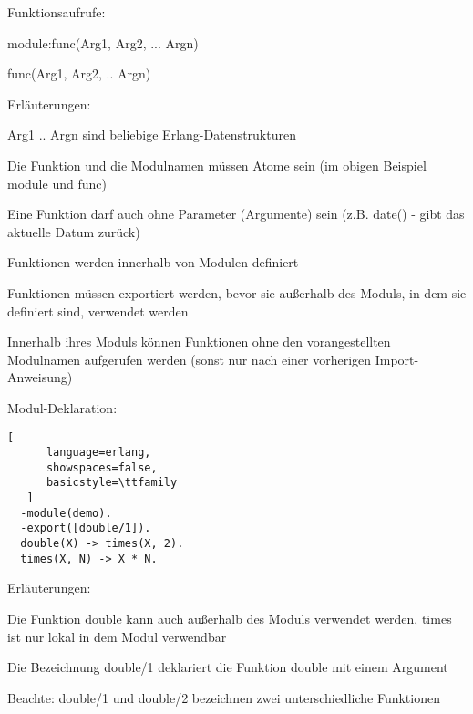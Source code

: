 \documentclass[10pt]{article}
\begin{document}
\begin{itemize*}
Funktionsaufrufe:
\begin{itemize*}
  \item module:func(Arg1, Arg2, ... Argn)
  \item func(Arg1, Arg2, .. Argn)
  \item Erläuterungen:
  \begin{itemize*}
    \item Arg1 .. Argn sind beliebige Erlang-Datenstrukturen
    \item Die Funktion und die Modulnamen müssen Atome sein (im obigen Beispiel module und func)
    \item Eine Funktion darf auch ohne Parameter (Argumente) sein (z.B. date() - gibt das aktuelle Datum zurück)
    \item Funktionen werden innerhalb von Modulen definiert
    \item Funktionen müssen exportiert werden, bevor sie außerhalb des Moduls, in dem sie definiert sind, verwendet werden
    \item Innerhalb ihres Moduls können Funktionen ohne den vorangestellten Modulnamen aufgerufen werden (sonst nur nach einer vorherigen Import-Anweisung)
  \end{itemize*}
\end{itemize*}

Modul-Deklaration:
\begin{lstlisting}[
      language=erlang,
      showspaces=false,
      basicstyle=\ttfamily
   ]
  -module(demo).
  -export([double/1]).
  double(X) -> times(X, 2).
  times(X, N) -> X * N.
        \end{lstlisting}
\begin{itemize*}
  \item Erläuterungen:
  \item Die Funktion double kann auch außerhalb des Moduls verwendet werden, times ist nur lokal in dem Modul verwendbar
  \item Die Bezeichnung double/1 deklariert die Funktion double mit einem Argument
  \item Beachte: double/1 und double/2 bezeichnen zwei unterschiedliche Funktionen
\end{itemize*}


\end{itemize*}
\end{document}
